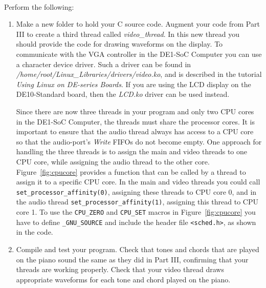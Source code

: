 \documentclass[epsfig,10pt,fullpage]{article}
\begin{document}
~\\
\noindent
Perform the following:

\begin{enumerate}
\item Make a new folder to hold your C source code. Augment your code from Part III to
create a third thread called {\it video\_thread}. In this new thread you should provide
the code for drawing waveforms on the display. To communicate with the VGA controller
in the DE1-SoC Computer you can use a character device driver. Such a driver can be found
in {\it /home/root/Linux\_Libraries/drivers/video.ko}, and is described in the tutorial 
{\it Using Linux on DE-series Boards}. If you are using the LCD display on the
DE10-Standard board, then the {\it LCD.ko} driver can be used instead.

Since there are now three threads in your program and only two CPU cores in the DE1-SoC
Computer, the threads must share the processor cores. It is important to ensure that
the audio thread always has access to a CPU core so that the audio-port's {\it Write} FIFOs
do not become empty. One approach for handling the three threads is to assign
the main and video threads to one CPU core, while assigning the audio thread to the other
core. Figure~\ref{fig:cpucore} provides a function that can be called by a thread to
assign it to a specific CPU core. In the main and video threads you could call 
\texttt{set\_processor\_affinity(0)}, assigning these threads to CPU core 0, 
and in the audio thread \texttt{set\_processor\_affinity(1)}, assigning 
this thread to CPU core 1. To use the \texttt{CPU\_ZERO} and \texttt{CPU\_SET} macros in 
Figure~\ref{fig:cpucore} you have to define \texttt{\_GNU\_SOURCE} and include the header
file \texttt{<sched.h>}, as shown in the code.
\item Compile and test your program. Check that tones and chords that are played on the
piano sound the same as they did in Part III, confirming that your threads are working
properly. Check that your video thread draws appropriate waveforms for each tone and chord
played on the piano.
\end{enumerate}
\end{document}
